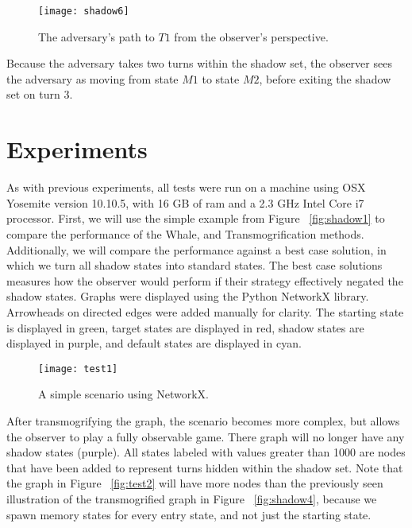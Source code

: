 \begin{figure}[h!]
\begin{center}

  \texttt{[image: shadow6]}
  \end{center}

  \caption{The adversary's path to $T1$ from the observer's perspective.}
  
  \label{fig:shadow6}
\end{figure}

Because the adversary takes two turns within the shadow set, the observer sees the adversary as moving from state $M1$ to state $M2$, before exiting the shadow set on turn 3. 


\section{Experiments}

As with previous experiments, all tests were run on  a machine using OSX Yosemite version 10.10.5, with 16 GB of ram and a 2.3 GHz Intel Core i7 processor. First, we will use the simple example from Figure ~\ref{fig:shadow1} to compare the performance of the Whale, and Transmogrification methods. Additionally, we will compare the performance against a best case solution, in which we turn all shadow states into standard states. The best case solutions measures how the observer would perform if their strategy effectively negated the shadow states. Graphs were displayed using the Python NetworkX library. Arrowheads on directed edges were added manually for clarity. The starting state is displayed in green, target states are displayed in red, shadow states are displayed in purple, and default states are displayed in cyan.

\begin{figure}[h!]
\begin{center}

  \texttt{[image: test1]}
  \end{center}

  \caption{A simple scenario using NetworkX.}
  
  \label{fig:test1}
\end{figure}

After transmogrifying the graph, the scenario becomes more complex, but allows the observer to play a fully observable game. There graph will no longer have any shadow states (purple). All states labeled with values greater than 1000 are nodes that have been added to represent turns hidden within the shadow set. Note that the graph in Figure ~\ref{fig:test2} will have more nodes than the previously seen illustration of the transmogrified graph in Figure ~\ref{fig:shadow4}, because we spawn memory states for every entry state, and not just the starting state. 

